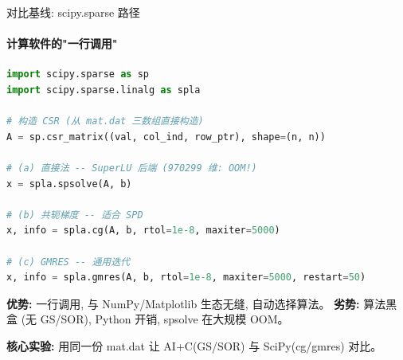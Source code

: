 \documentclass[12pt,aspectratio=169]{beamer}
\begin{document}
\begin{frame}{对比基线: scipy.sparse 路径}
\framesubtitle{计算软件的"一行调用"}

\begin{lstlisting}[language=Python,basicstyle=\ttfamily\footnotesize,belowskip=-2pt,aboveskip=0pt,numbers=none]
import scipy.sparse as sp
import scipy.sparse.linalg as spla

# 构造 CSR (从 mat.dat 三数组直接构造)
A = sp.csr_matrix((val, col_ind, row_ptr), shape=(n, n))

# (a) 直接法 -- SuperLU 后端 (970299 维: OOM!)
x = spla.spsolve(A, b)

# (b) 共轭梯度 -- 适合 SPD
x, info = spla.cg(A, b, rtol=1e-8, maxiter=5000)

# (c) GMRES -- 通用迭代
x, info = spla.gmres(A, b, rtol=1e-8, maxiter=5000, restart=50)
\end{lstlisting}

\vspace{2pt}
\footnotesize
\textbf{优势:} 一行调用, 与 NumPy/Matplotlib 生态无缝, 自动选择算法。
\textbf{劣势:} 算法黑盒 (无 GS/SOR), Python 开销, spsolve 在大规模 OOM。

\vspace{2pt}
\normalsize \textbf{核心实验:} 用同一份 mat.dat 让 AI+C(GS/SOR) 与 SciPy(cg/gmres) 对比。
\end{frame}
\end{document}
